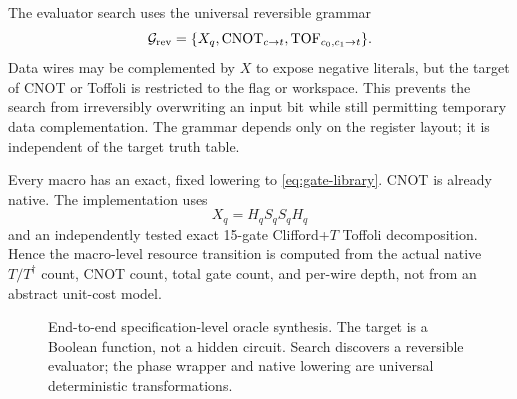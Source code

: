 The evaluator search uses the universal reversible grammar
\begin{equation}
\mathcal{G}_{\mathrm{rev}}
=\{X_q,\operatorname{CNOT}_{c\rightarrow t},\operatorname{TOF}_{c_0,c_1\rightarrow t}\}.
\label{eq:nct-grammar}
\end{equation}
Data wires may be complemented by $X$ to expose negative literals, but the target of CNOT or Toffoli is restricted to the flag or workspace.  This prevents the search from irreversibly overwriting an input bit while still permitting temporary data complementation.  The grammar depends only on the register layout; it is independent of the target truth table.

Every macro has an exact, fixed lowering to \eqref{eq:gate-library}.  CNOT is already native.  The implementation uses
\begin{equation}
X_q=H_qS_qS_qH_q
\end{equation}
and an independently tested exact 15-gate Clifford+$T$ Toffoli decomposition.  Hence the macro-level resource transition is computed from the actual native $T/T^\dagger$ count, CNOT count, total gate count, and per-wire depth, not from an abstract unit-cost model.

\begin{figure}[t]
\centering
{}
\caption{End-to-end specification-level oracle synthesis.  The target is a Boolean function, not a hidden circuit.  Search discovers a reversible evaluator; the phase wrapper and native lowering are universal deterministic transformations.}
\label{fig:oracle-pipeline}
\end{figure}

